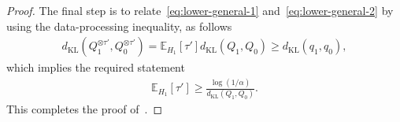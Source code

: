 \documentclass[10pt,a4paper]{amsart}
\newcommand{\dkl}{d_{\mathrm{KL}}}
\begin{document}
\begin{proof}
        The final step is to relate~\eqref{eq:lower-general-1} and~\eqref{eq:lower-general-2} by using the data-processing inequality, as follows 
        \begin{align}
            \dkl(Q_1^{\otimes \tau'}, Q_0^{\otimes \tau'}) = \mathbb{E}_{H_1}[\tau'] \dkl(Q_1, Q_0) \geq \dkl(q_1, q_0),  
        \end{align}
        which implies the required statement
        \begin{align}
            \mathbb{E}_{H_1}[\tau'] \geq \frac{\log(1/\alpha)}{\dkl(Q_1, Q_0)}.
        \end{align}
        This completes the proof of~. 
        \end{proof}
\end{document}
